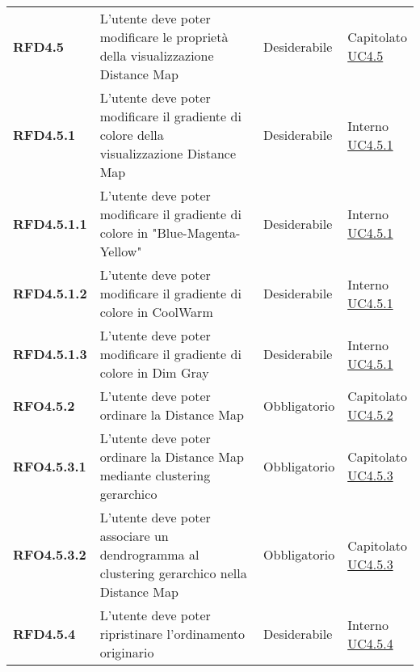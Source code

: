 \begin{longtable}[H]{| >{\raggedright\bfseries}m{20mm} | >{\raggedright}m{90mm} | >{\centering}m{25mm} | >{\centering\arraybackslash}m{30mm}|}
    RFD4.5
    & L'utente deve poter modificare le proprietà della visualizzazione Distance Map
    & Desiderabile
    & \makecell{ Capitolato \\ \hyperref[ssub:uc4.5]{UC4.5} }\\

    RFD4.5.1
    & L'utente deve poter modificare il gradiente di colore della visualizzazione Distance Map
    & Desiderabile
    & \makecell{ Interno \\ \hyperref[par:uc4.5.1]{UC4.5.1} }\\

    RFD4.5.1.1
    & L'utente deve poter modificare il gradiente di colore in "Blue-Magenta-Yellow"
    & Desiderabile
    & \makecell{ Interno \\ \hyperref[par:uc4.5.1]{UC4.5.1} }\\

    RFD4.5.1.2
    & L'utente deve poter modificare il gradiente di colore in CoolWarm
    & Desiderabile
    & \makecell{ Interno \\ \hyperref[par:uc4.5.1]{UC4.5.1} }\\

    RFD4.5.1.3
    & L'utente deve poter modificare il gradiente di colore in Dim Gray
    & Desiderabile
    & \makecell{ Interno \\ \hyperref[par:uc4.5.1]{UC4.5.1} }\\

    RFO4.5.2
    & L'utente deve poter ordinare la Distance Map
    & Obbligatorio
    & \makecell{ Capitolato \\ \hyperref[par:uc4.5.2]{UC4.5.2} }\\

    RFO4.5.3.1
    & L'utente deve poter ordinare la Distance Map mediante clustering gerarchico
    & Obbligatorio
    & \makecell{ Capitolato \\ \hyperref[par:uc4.5.3]{UC4.5.3} }\\

    RFO4.5.3.2
    & L'utente deve poter associare un dendrogramma al clustering gerarchico nella Distance Map
    & Obbligatorio
    & \makecell{ Capitolato \\ \hyperref[par:uc4.5.3]{UC4.5.3} }\\

    RFD4.5.4
    & L'utente deve poter ripristinare l'ordinamento originario
    & Desiderabile
    & \makecell{ Interno \\ \hyperref[par:uc4.5.4]{UC4.5.4} }\\


\end{longtable}
